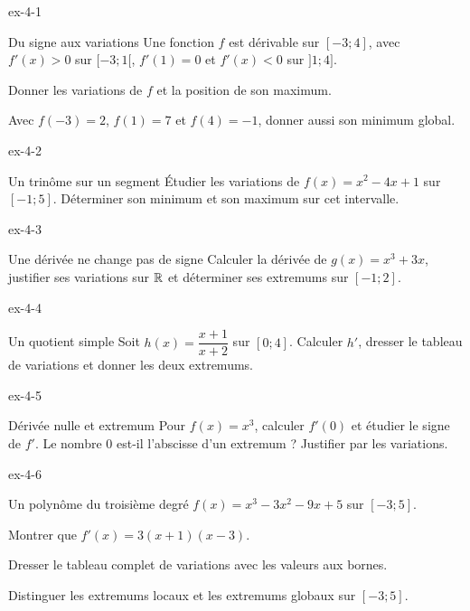 \begin{blocLivre}{ex-4-1}
\begin{exercice}[1]{Du signe aux variations}
Une fonction $f$ est dérivable sur $[-3;4]$, avec $f'(x)>0$ sur $[-3;1[$,
$f'(1)=0$ et $f'(x)<0$ sur $]1;4]$.
\begin{questions}\item Donner les variations de $f$ et la position de son maximum.
\item Avec $f(-3)=2$, $f(1)=7$ et $f(4)=-1$, donner aussi son minimum global.
\end{questions}
\end{exercice}
\end{blocLivre}
\begin{blocLivre}{ex-4-2}
\begin{exercice}[1]{Un trinôme sur un segment}
Étudier les variations de $f(x)=x^2-4x+1$ sur $[-1;5]$.
Déterminer son minimum et son maximum sur cet intervalle.
\end{exercice}
\end{blocLivre}
\begin{blocLivre}{ex-4-3}
\begin{exercice}[1]{Une dérivée ne change pas de signe}
Calculer la dérivée de $g(x)=x^3+3x$, justifier ses variations sur $\mathbb{R}$
et déterminer ses extremums sur $[-1;2]$.
\end{exercice}
\end{blocLivre}
\begin{blocLivre}{ex-4-4}
\begin{exercice}[1]{Un quotient simple}
Soit $h(x)=\dfrac{x+1}{x+2}$ sur $[0;4]$.
Calculer $h'$, dresser le tableau de variations et donner les deux extremums.
\end{exercice}
\end{blocLivre}
\begin{blocLivre}{ex-4-5}
\begin{exercice}[1]{Dérivée nulle et extremum}
Pour $f(x)=x^3$, calculer $f'(0)$ et étudier le signe de $f'$.
Le nombre 0 est-il l'abscisse d'un extremum ? Justifier par les variations.
\end{exercice}
\end{blocLivre}
\clearpage
{}
\begin{blocLivre}{ex-4-6}
\begin{exercice}[2]{Un polynôme du troisième degré}
$f(x)=x^3-3x^2-9x+5$ sur $[-3;5]$.
\begin{questions}\item Montrer que $f'(x)=3(x+1)(x-3)$.
\item Dresser le tableau complet de variations avec les valeurs aux bornes.
\item Distinguer les extremums locaux et les extremums globaux sur $[-3;5]$.
\end{questions}
\end{exercice}
\end{blocLivre}

